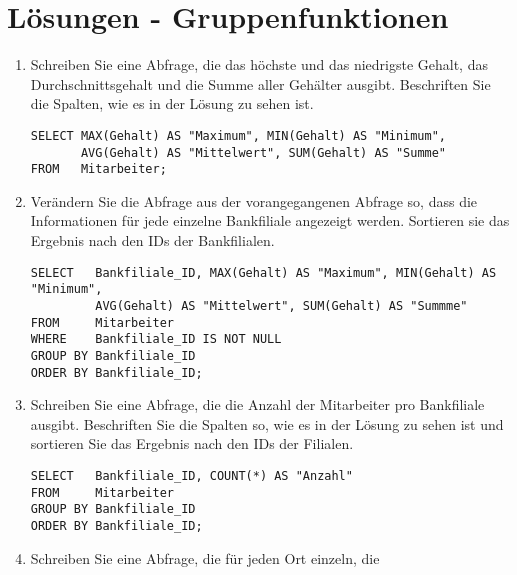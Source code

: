 \clearpage
    \section{L\"osungen - Gruppenfunktionen}
      \begin{enumerate}
        \item Schreiben Sie eine Abfrage, die das h\"ochste und das niedrigste
        Gehalt, das Durchschnittsgehalt und die Summe aller Geh\"alter ausgibt.
        Beschriften Sie die Spalten, wie es in der L\"osung zu sehen ist.
        \begin{msoraclesql}[\FALSE]
        \end{msoraclesql}
        \begin{lstlisting}[language=oracle_sql]
SELECT MAX(Gehalt) AS "Maximum", MIN(Gehalt) AS "Minimum",
       AVG(Gehalt) AS "Mittelwert", SUM(Gehalt) AS "Summe"
FROM   Mitarbeiter;
        \end{lstlisting}
        \item Ver\"andern Sie die Abfrage aus der vorangegangenen Abfrage so,
        dass die Informationen f\"ur jede einzelne Bankfiliale angezeigt werden.
        Sortieren sie das Ergebnis nach den IDs der Bankfilialen.
        \begin{msoraclesql}[\FALSE]
        \end{msoraclesql}
        \begin{lstlisting}[language=oracle_sql]
SELECT   Bankfiliale_ID, MAX(Gehalt) AS "Maximum", MIN(Gehalt) AS "Minimum",
         AVG(Gehalt) AS "Mittelwert", SUM(Gehalt) AS "Summme"
FROM     Mitarbeiter
WHERE    Bankfiliale_ID IS NOT NULL
GROUP BY Bankfiliale_ID
ORDER BY Bankfiliale_ID;
        \end{lstlisting}
        \item Schreiben Sie eine Abfrage, die die Anzahl der Mitarbeiter pro
        Bankfiliale ausgibt. Beschriften Sie die Spalten so, wie es in der
        L\"osung zu sehen ist und sortieren Sie das Ergebnis nach den IDs der
        Filialen.
        \begin{msoraclesql}[\FALSE]
        \end{msoraclesql}
        \begin{lstlisting}[language=oracle_sql]
SELECT   Bankfiliale_ID, COUNT(*) AS "Anzahl"
FROM     Mitarbeiter
GROUP BY Bankfiliale_ID
ORDER BY Bankfiliale_ID;
        \end{lstlisting}
        \item Schreiben Sie eine Abfrage, die f\"ur jeden Ort einzeln, die

\end{enumerate}
